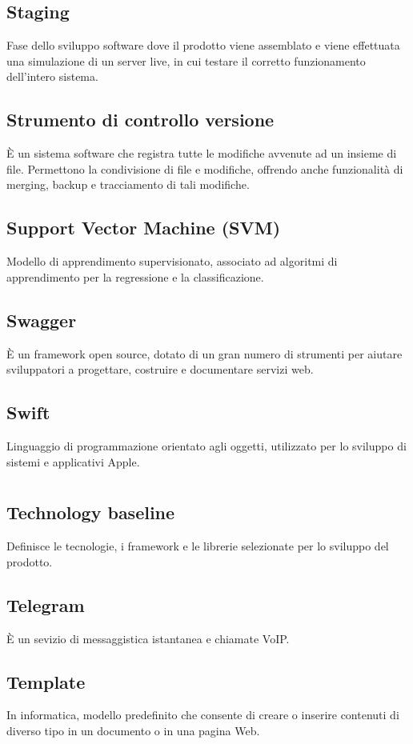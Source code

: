 	\subsection*{Staging}
	Fase dello sviluppo software dove il prodotto viene assemblato e viene effettuata una simulazione di un server live, in cui testare il corretto funzionamento dell'intero sistema.
	\subsection*{Strumento di controllo versione}
	È un sistema software che registra tutte le modifiche avvenute ad un insieme di file. Permettono la condivisione di file e modifiche, offrendo anche funzionalità di merging, backup e tracciamento di tali modifiche.
	\subsection*{Support Vector Machine (SVM)}
	Modello di apprendimento supervisionato, associato ad algoritmi di apprendimento per la regressione e la classificazione.
	\subsection*{Swagger}
	È un framework open source, dotato di un gran numero di strumenti per aiutare sviluppatori a progettare, costruire e documentare servizi web.
	\subsection*{Swift}
	Linguaggio di programmazione orientato agli oggetti, utilizzato per lo sviluppo di sistemi e applicativi Apple.
\pagebreak
\section{}
	\subsection*{Technology baseline}
	Definisce le tecnologie, i framework e le librerie selezionate per lo sviluppo del prodotto.
	\subsection*{Telegram}
	È un sevizio di messaggistica istantanea e chiamate VoIP.
	\subsection*{Template}
	In informatica, modello predefinito che consente di creare o inserire contenuti di diverso tipo in un documento o in una pagina Web.
